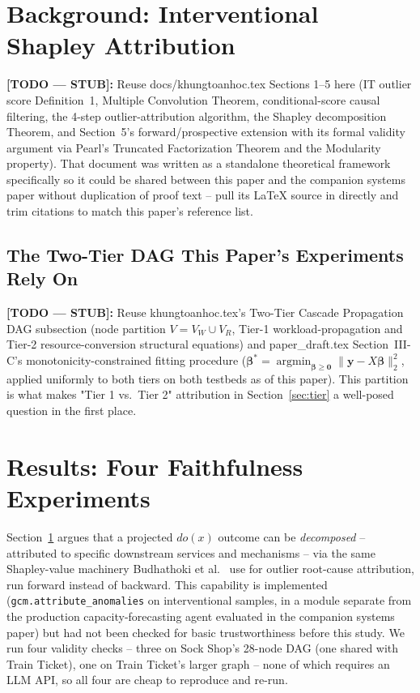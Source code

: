 \documentclass[journal, 10pt]{IEEEtran}
\begin{document}
\section{Background: Interventional Shapley Attribution}
\label{sec:background}
\textbf{[TODO --- STUB]:} Reuse docs/khungtoanhoc.tex Sections 1--5 here (IT outlier score
Definition~1, Multiple Convolution Theorem, conditional-score causal
filtering, the 4-step outlier-attribution algorithm, the Shapley
decomposition Theorem, and Section~5's forward/prospective extension with
its formal validity argument via Pearl's Truncated Factorization Theorem and
the Modularity property). That document was written as a standalone
theoretical framework specifically so it could be shared between this paper
and the companion systems paper without duplication of proof text -- pull
its LaTeX source in directly and trim citations to match this paper's
reference list.

\subsection{The Two-Tier DAG This Paper's Experiments Rely On}
\textbf{[TODO --- STUB]:} Reuse khungtoanhoc.tex's Two-Tier Cascade Propagation DAG subsection
(node partition $V = V_W \cup V_R$, Tier-1 workload-propagation and Tier-2
resource-conversion structural equations) and paper\_draft.tex
Section~III-C's monotonicity-constrained fitting procedure ($\boldsymbol\beta^*
= \operatorname*{argmin}_{\boldsymbol\beta\ge\mathbf 0}\lVert \mathbf y - X\boldsymbol\beta\rVert_2^2$,
applied uniformly to both tiers on both testbeds as of this paper). This
partition is what makes "Tier 1 vs.\ Tier 2" attribution in
Section~\ref{sec:tier} a well-posed question in the first place.

\section{Results: Four Faithfulness Experiments}
\label{sec:results}

Section~\ref{sec:background} argues that a projected $do(x)$ outcome can be \emph{decomposed} -- attributed to specific downstream services and mechanisms -- via the same Shapley-value machinery Budhathoki et al.\ \cite{budhathoki2022rootcause} use for outlier root-cause attribution, run forward instead of backward. This capability is implemented (\texttt{gcm.attribute\_anomalies} on interventional samples, in a module separate from the production capacity-forecasting agent evaluated in the companion systems paper) but had not been checked for basic trustworthiness before this study. We run four validity checks -- three on Sock Shop's 28-node DAG (one shared with Train Ticket), one on Train Ticket's larger graph -- none of which requires an LLM API, so all four are cheap to reproduce and re-run.
\end{document}
